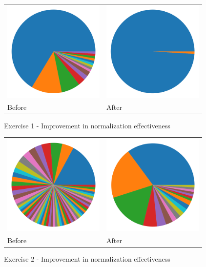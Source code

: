 \begin{figure}
\centering
\begin{tabular}{ >{\centering\arraybackslash}m{14em} >{\centering\arraybackslash}m{14em} }
\includegraphics[height=5cm]{graphs/cluster-baseline-1.png}
&
\includegraphics[height=5cm]{graphs/cluster-aggressive-1.png} \\
Before & After
\end{tabular}
\caption{Exercise 1 - Improvement in normalization effectiveness}
\label{fig:improvements-clusters-1}
\end{figure}

\begin{figure}
\centering
\begin{tabular}{ >{\centering\arraybackslash}m{14em} >{\centering\arraybackslash}m{14em} }
\includegraphics[height=5cm]{graphs/cluster-baseline-2.png}
&
\includegraphics[height=5cm]{graphs/cluster-aggressive-2.png} \\
Before & After
\end{tabular}
\caption{Exercise 2 - Improvement in normalization effectiveness}
\label{fig:improvements-clusters-2}
\end{figure}

